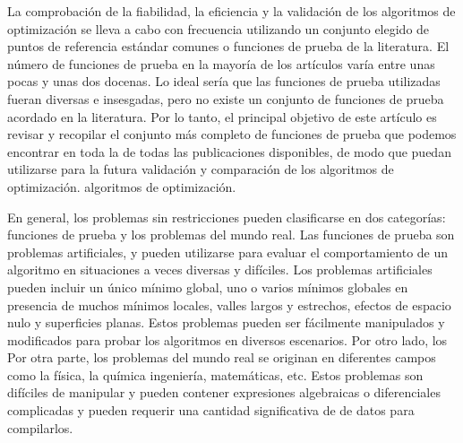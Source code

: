 \documentclass[10pt]{article}
\begin{document}
La comprobación de la fiabilidad, la eficiencia y la validación de los algoritmos de optimización se lleva a cabo con frecuencia utilizando un conjunto elegido de puntos de referencia estándar comunes o funciones de prueba de la literatura. El número de funciones de prueba en la mayoría de los artículos varía entre unas pocas y unas dos docenas. Lo ideal sería que las funciones de prueba utilizadas fueran diversas e insesgadas, pero no existe un conjunto de funciones de prueba acordado en la literatura. Por lo tanto, el principal objetivo de este artículo es revisar y recopilar el conjunto más completo de funciones de prueba que podemos encontrar en toda la de todas las publicaciones disponibles, de modo que puedan utilizarse para la futura validación y comparación de los algoritmos de optimización. algoritmos de optimización.

En general, los problemas sin restricciones pueden clasificarse en dos categorías: funciones de prueba y los problemas del mundo real. Las funciones de prueba son problemas artificiales, y pueden utilizarse para evaluar el comportamiento de un algoritmo en situaciones a veces diversas y difíciles. Los problemas artificiales pueden incluir un único mínimo global, uno o varios mínimos globales en presencia de muchos mínimos locales, valles largos y estrechos, efectos de espacio nulo y superficies planas. Estos problemas pueden ser fácilmente manipulados y modificados para probar los algoritmos en diversos escenarios. Por otro lado, los Por otra parte, los problemas del mundo real se originan en diferentes campos como la física, la química ingeniería, matemáticas, etc. Estos problemas son difíciles de manipular y pueden contener expresiones algebraicas o diferenciales complicadas y pueden requerir una cantidad significativa de de datos para compilarlos.
\end{document}
